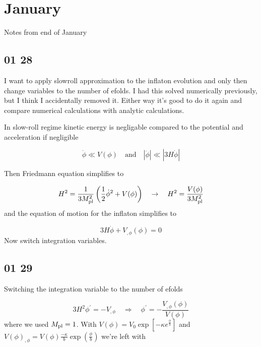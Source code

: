 \section*{January}

Notes from end of January

\subsection*{01 28}
I want to apply slowroll approximation to the inflaton evolution and only then change variables to the number of efolds. I had this solved numerically previously, but I think I accidentally removed it. Either way it's good to do it again and compare numerical calculations with analytic calculations.

In slow-roll regime kinetic energy is negligable compared to the potential and acceleration if negligible

\begin{equation*}
    \dot{\phi} \ll V(\phi) \quad \text{and} \quad |\ddot{\phi}| \ll |3H \dot{\phi}|
\end{equation*}

Then Friedmann equation simplifies to

\begin{equation*}
    H^2 = \frac{1}{3 M_{\rm pl}^2} \left( \frac{1}{2} \dot{\phi}^2 + V(\phi) \right) \quad \rightarrow \quad H^2 = \frac{V(\phi)}{3 M_{\rm pl}^2}
\end{equation*}
and the equation of motion for the inflaton simplifies to

\begin{equation*}
    3H \dot{\phi} + V_{,\phi} (\phi) = 0
\end{equation*}
Now switch integration variables.

\subsection*{01 29}

Switching the integration variable to the number of efolds

\begin{equation*}
    3H^2 \phi^{\prime} = -V_{, \phi} \quad \Rightarrow \quad \phi^{\prime} = - \frac{V_{, \phi}(\phi)}{V(\phi)}
\end{equation*}
where we used $M_{\rm pl}=1$. With $V(\phi) = V_0 \exp \left[ - \kappa e^{\frac{\phi}{b}} \right]$ and $V(\phi)_{, \phi} = V(\phi) \frac{-\kappa}{b} \exp \left({\frac{\phi}{b}} \right) $  we're left with

